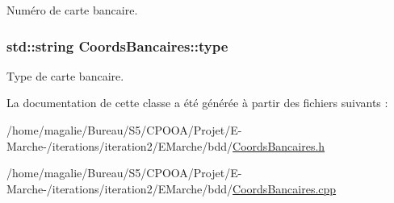 Numéro de carte bancaire. 

\hypertarget{class_coords_bancaires_ad34142224a2753ad54dddf8d537564b1}{
\subsubsection[{type}]{\setlength{\rightskip}{0pt plus 5cm}std\-::string Coords\-Bancaires\-::type\hspace{0.3cm}{\ttfamily [protected]}}}\label{class_coords_bancaires_ad34142224a2753ad54dddf8d537564b1}


Type de carte bancaire. 



La documentation de cette classe a été générée à partir des fichiers suivants \-:\begin{DoxyCompactItemize}
\item 
/home/magalie/\-Bureau/\-S5/\-C\-P\-O\-O\-A/\-Projet/\-E-\/\-Marche-\//iterations/iteration2/\-E\-Marche/bdd/\hyperlink{_coords_bancaires_8h}{Coords\-Bancaires.\-h}\item 
/home/magalie/\-Bureau/\-S5/\-C\-P\-O\-O\-A/\-Projet/\-E-\/\-Marche-\//iterations/iteration2/\-E\-Marche/bdd/\hyperlink{_coords_bancaires_8cpp}{Coords\-Bancaires.\-cpp}\end{DoxyCompactItemize}
